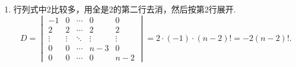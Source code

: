 \documentclass[UTF8,12pt,a4paper,fontset=fandol]{ctexart}
\begin{document}
\begin{solve}
\begin{enumerate}
                \item 行列式中2比较多，用全是2的第二行去消，然后按第2行展开.
                      \[D=\begin{vmatrix}
                              -1     & 0      & \cdots & 0      & 0      \\
                              2      & 2      & \cdots & 2      & 2      \\
                              \vdots & \vdots & \ddots & \vdots & \vdots \\
                              0      & 0      & \cdots & n-3    & 0      \\
                              0      & 0      & \cdots & 0      & n-2
                          \end{vmatrix}=2\cdot(-1)\cdot(n-2)!=-2(n-2)!.\]


\end{enumerate}
\end{solve}
\end{document}
